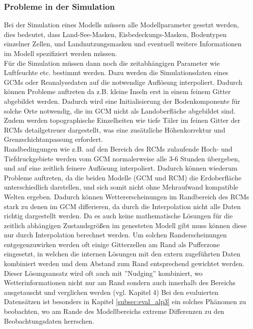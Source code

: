 \subsubsection{Probleme in der Simulation} \label{sec:problems_in_simulation}
Bei der Simulation eines Modells müssen alle Modellparameter gesetzt werden, dies bedeutet, dass Land-See-Masken, Eisbedeckungs-Masken, Bodentypen einzelner Zellen, und Landnutzungsmasken und eventuell weitere Informationen im Modell spezifiziert werden müssen.\\
Für die Simulation müssen dann noch die zeitabhängigen Parameter wie Luftfeuchte etc. bestimmt werden. Dazu werden die Simulationsdaten eines GCMs oder Reanalysedaten auf die notwendige Auflösung interpoliert. Dadurch können Probleme auftreten da z.B. kleine Inseln erst in einem feinem Gitter abgebildet  werden. Dadurch wird eine Initialisierung der Bodenkomponente für solche Orte notwendig, die im GCM nicht als Landoberfläche abgebildet sind. Zudem werden topographische Einzelheiten wie tiefe Täler im feinen Gitter der RCMs detailgetreuer dargestellt, was eine zusätzliche Höhenkorrektur und Grenzschichtanpassung erfordert.\\
Randbedingungen wie z.B. auf den Bereich des RCMs zulaufende Hoch- und Tiefdruckgebiete werden vom GCM normalerweise alle 3-6 Stunden übergeben, und auf eine zeitlich feinere Auflösung interpoliert. Dadurch können wiederum Probleme auftreten, da die beiden Modelle (GCM und RCM) die Erdoberfläche unterschiedlich darstellen, und sich somit nicht ohne Mehraufwand kompatible Welten ergeben. Dadurch können Wettererscheinungen im Randbereich des RCMs stark zu denen im GCM differieren, da durch die Interpolation nicht alle Daten richtig dargestellt werden. Da es auch keine mathematische Lösungen für die zeitlich abhängigen Zustandsgrößen im genesteten Modell gibt muss können diese nur durch Interpolation berechnet werden. Um solchen Randerscheinungen entgegenzuwirken werden oft einige Gitterzellen am Rand als Pufferzone eingesetzt, in welchen die internen Lösungen mit den extern zugeführten Daten kombiniert werden und dem Abstand zum Rand entsprechend gewichtet werden. Dieser Lösungsansatz wird oft auch mit ''Nudging'' kombiniert, wo Wetterinformationen nicht nur am Rand sondern auch innerhalb des Bereichs ausgetauscht und verglichen werden (vgl. \cite{RCM} Kapitel 4) Bei den evaluierten Datensätzen ist besonders in Kapitel \ref{subsec:eval_alp3} ein solches Phänomen zu beobachten, wo am Rande des Modellbereichs extreme Differenzen zu den Beobachtungsdaten herrschen.
